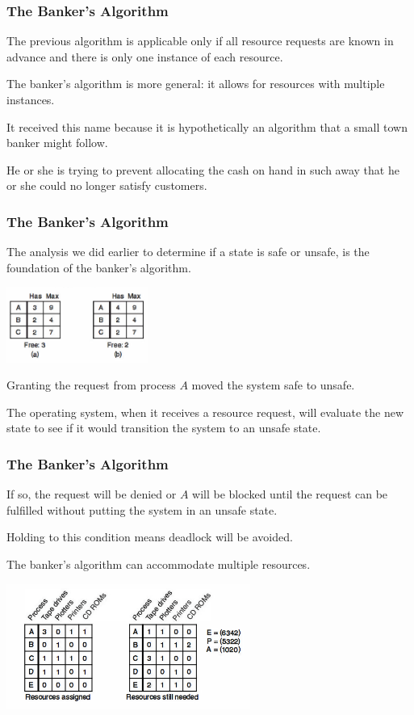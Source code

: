 \begin{frame}
\frametitle{The Banker's Algorithm}

The previous algorithm is applicable only if all resource requests are known in advance and there is only one instance of each resource.

The banker's algorithm is more general: it allows for resources with multiple instances. 

It received this name because it is hypothetically an algorithm that a small town banker might follow.

He or she is trying to prevent allocating the cash on hand in such away that he or she could no longer satisfy customers.

\end{frame}

\begin{frame}
\frametitle{The Banker's Algorithm}


The analysis we did earlier to determine if a state is safe or unsafe, is the foundation of the banker's algorithm. 

\begin{center}
\includegraphics[width=0.35\textwidth]{images/unsafe-state-initial.png}
\end{center}

Granting the request from process $A$ moved the system safe to unsafe.

The operating system, when it receives a resource request, will evaluate the new state to see if it would transition the system to an unsafe state.

\end{frame}

\begin{frame}
\frametitle{The Banker's Algorithm}

If so, the request will be denied or $A$ will be blocked until the request can be fulfilled without putting the system in an unsafe state. 

Holding to this condition means deadlock will be avoided.

The banker's algorithm can accommodate multiple resources.

\begin{center}
\includegraphics[width=0.6\textwidth]{images/bankers-multiple.png}
\end{center}


\end{frame}

